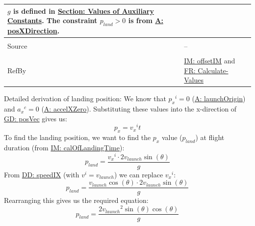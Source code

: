 \documentclass[12pt]{article}
\begin{document}
\begin{minipage}{\textwidth}
\begin{tabular}{>{\raggedright}p{}>{\raggedright\arraybackslash}p{}}
        $g$ is defined in \hyperref[Sec:AuxConstants]{Section: Values of Auxiliary Constants}.
        The constraint ${p_{land}}>0$ is from \hyperref[posXDirection]{A: posXDirection}.
\\ \midrule \\
Source & --
\\ \midrule \\
RefBy & \hyperref[IM:offsetIM]{IM: offsetIM} and \hyperref[calcValues]{FR: Calculate-Values}
\\ \bottomrule
\end{tabular}
\end{minipage}
Detailed derivation of landing position:
We know that ${{p_{x}}^{i}}=0$ (\hyperref[launchOrigin]{A: launchOrigin}) and ${{a_{x}}^{c}}=0$ (\hyperref[accelXZero]{A: accelXZero}). Substituting these values into the x-direction of \hyperref[GD:posVec]{GD: posVec} gives us:
\begin{displaymath}
{p_{x}}={{v_{x}}^{i}} t
\end{displaymath}
To find the landing position, we want to find the ${p_{x}}$ value (${p_{land}}$) at flight duration (from \hyperref[IM:calOfLandingTime]{IM: calOfLandingTime}):
\begin{displaymath}
{p_{land}}=\frac{{{v_{x}}^{i}}\cdot{}2 {v_{launch}} \sin\left(θ\right)}{g}
\end{displaymath}
From \hyperref[DD:speedIX]{DD: speedIX} (with ${v^{i}}={v_{launch}}$) we can replace ${{v_{x}}^{i}}$:
\begin{displaymath}
{p_{land}}=\frac{{v_{launch}} \cos\left(θ\right)\cdot{}2 {v_{launch}} \sin\left(θ\right)}{g}
\end{displaymath}
Rearranging this gives us the required equation:
\begin{displaymath}
{p_{land}}=\frac{2 {v_{launch}}^{2} \sin\left(θ\right) \cos\left(θ\right)}{g}
\end{displaymath}
\par~
\end{document}
